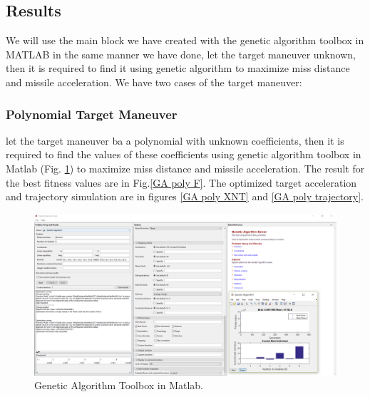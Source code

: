 
\subsection{Results}
We will use the main block we have created with the genetic algorithm toolbox in MATLAB in the same manner we have done, let the target maneuver unknown, then it is required to find it using genetic algorithm to maximize miss distance and missile acceleration. We have two cases of the target maneuver:

\subsubsection{Polynomial Target Maneuver}
let the target maneuver ba a polynomial with unknown coefficients, then it is required to find the values of these coefficients using genetic algorithm toolbox in Matlab (Fig. \ref{GA toolbox poly}) to maximize miss distance and missile acceleration. The result for the best fitness values are in Fig.\ref{GA poly F}. The optimized target acceleration and trajectory simulation are in figures \ref{GA poly XNT} and \ref{GA poly trajectory}. 

\begin{figure}[H]
	\centering
	\includegraphics[scale = 0.4]{fig/GApoly.PNG}
	\caption{Genetic Algorithm Toolbox in Matlab.}
	\label{GA toolbox poly}
\end{figure}

